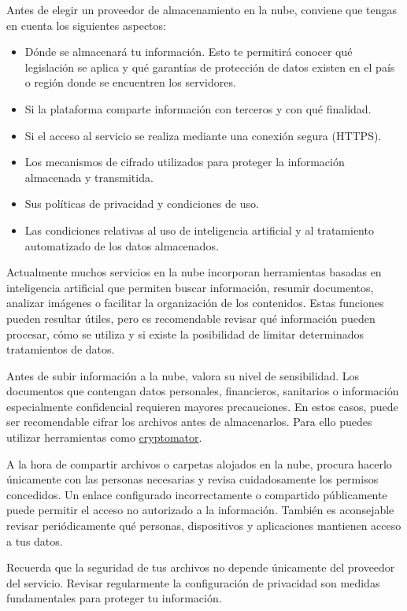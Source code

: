 \documentclass[
  spanish,
  a4paper,
  openany]{book}
\begin{document}
Antes de elegir un proveedor de almacenamiento en la nube, conviene que tengas en cuenta los siguientes aspectos:

\begin{itemize}
\item
  Dónde se almacenará tu información. Esto te permitirá conocer qué legislación se aplica y qué garantías de protección de datos existen en el país o región donde se encuentren los servidores.
\item
  Si la plataforma comparte información con terceros y con qué finalidad.
\item
  Si el acceso al servicio se realiza mediante una conexión segura (HTTPS).
\item
  Los mecanismos de cifrado utilizados para proteger la información almacenada y transmitida.
\item
  Sus políticas de privacidad y condiciones de uso.
\item
  Las condiciones relativas al uso de inteligencia artificial y al tratamiento automatizado de los datos almacenados.
\end{itemize}

Actualmente muchos servicios en la nube incorporan herramientas basadas en inteligencia artificial que permiten buscar información, resumir documentos, analizar imágenes o facilitar la organización de los contenidos. Estas funciones pueden resultar útiles, pero es recomendable revisar qué información pueden procesar, cómo se utiliza y si existe la posibilidad de limitar determinados tratamientos de datos.

Antes de subir información a la nube, valora su nivel de sensibilidad. Los documentos que contengan datos personales, financieros, sanitarios o información especialmente confidencial requieren mayores precauciones. En estos casos, puede ser recomendable cifrar los archivos antes de almacenarlos. Para ello puedes utilizar herramientas como \href{https://cryptomator.org/}{cryptomator}.

A la hora de compartir archivos o carpetas alojados en la nube, procura hacerlo únicamente con las personas necesarias y revisa cuidadosamente los permisos concedidos. Un enlace configurado incorrectamente o compartido públicamente puede permitir el acceso no autorizado a la información. También es aconsejable revisar periódicamente qué personas, dispositivos y aplicaciones mantienen acceso a tus datos.

Recuerda que la seguridad de tus archivos no depende únicamente del proveedor del servicio. Revisar regularmente la configuración de privacidad son medidas fundamentales para proteger tu información.
\end{document}
